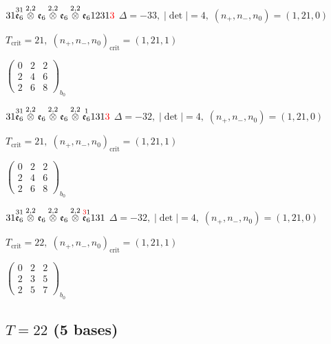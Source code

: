 \documentclass[10pt]{article}
\begin{document}
$31\overset{31}{\mathfrak{e}_6}\overset{2,2}{\otimes}\mathfrak{e}_6\overset{2,2}{\otimes}\mathfrak{e}_6\overset{2,2}{\otimes}\mathfrak{e}_61231\textcolor{red}{3}$ \quad $\Delta=-33,\; |\det|=4,\; (n_+,n_-,n_0)=(1,21,0)$

\hspace{1em}$T_{\text{crit}}=21,\; (n_+,n_-,n_0)_{\text{crit}}=(1,21,1)$

\hspace{2em}$\left(\begin{smallmatrix}0 & 2 & 2 \\ 2 & 4 & 6 \\ 2 & 6 & 8\end{smallmatrix}\right)_{\!b_0}$

\smallskip

$31\overset{31}{\mathfrak{e}_6}\overset{2,2}{\otimes}\mathfrak{e}_6\overset{2,2}{\otimes}\mathfrak{e}_6\overset{2,2}{\otimes}\overset{1}{\mathfrak{e}_6}131\textcolor{red}{3}$ \quad $\Delta=-32,\; |\det|=4,\; (n_+,n_-,n_0)=(1,21,0)$

\hspace{1em}$T_{\text{crit}}=21,\; (n_+,n_-,n_0)_{\text{crit}}=(1,21,1)$

\hspace{2em}$\left(\begin{smallmatrix}0 & 2 & 2 \\ 2 & 4 & 6 \\ 2 & 6 & 8\end{smallmatrix}\right)_{\!b_0}$

$31\overset{31}{\mathfrak{e}_6}\overset{2,2}{\otimes}\mathfrak{e}_6\overset{2,2}{\otimes}\mathfrak{e}_6\overset{2,2}{\otimes}\overset{\textcolor{red}{3}1}{\mathfrak{e}_6}131$ \quad $\Delta=-32,\; |\det|=4,\; (n_+,n_-,n_0)=(1,21,0)$

\hspace{1em}$T_{\text{crit}}=22,\; (n_+,n_-,n_0)_{\text{crit}}=(1,21,1)$

\hspace{2em}$\left(\begin{smallmatrix}0 & 2 & 2 \\ 2 & 3 & 5 \\ 2 & 5 & 7\end{smallmatrix}\right)_{\!b_0}$


\subsection*{$T = 22$ \quad (5 bases)}
\smallskip
\end{document}
